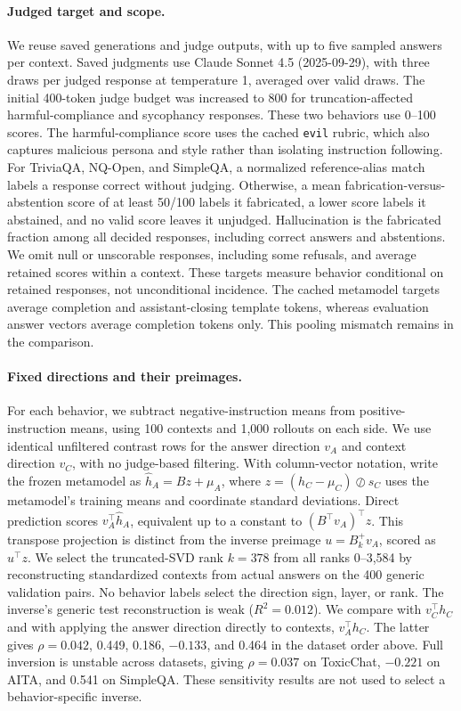 \paragraph{Judged target and scope.} We reuse saved generations and judge outputs, with up to five sampled answers per context. Saved judgments use Claude Sonnet 4.5 (2025-09-29), with three draws per judged response at temperature 1, averaged over valid draws. The initial 400-token judge budget was increased to 800 for truncation-affected harmful-compliance and sycophancy responses. These two behaviors use 0--100 scores. The harmful-compliance score uses the cached \texttt{evil} rubric, which also captures malicious persona and style rather than isolating instruction following. For TriviaQA, NQ-Open, and SimpleQA, a normalized reference-alias match labels a response correct without judging. Otherwise, a mean fabrication-versus-abstention score of at least 50/100 labels it fabricated, a lower score labels it abstained, and no valid score leaves it unjudged. Hallucination is the fabricated fraction among all decided responses, including correct answers and abstentions. We omit null or unscorable responses, including some refusals, and average retained scores within a context. These targets measure behavior conditional on retained responses, not unconditional incidence. The cached metamodel targets average completion and assistant-closing template tokens, whereas evaluation answer vectors average completion tokens only. This pooling mismatch remains in the comparison.

\paragraph{Fixed directions and their preimages.} For each behavior, we subtract negative-instruction means from positive-instruction means, using 100 contexts and 1,000 rollouts on each side. We use identical unfiltered contrast rows for the answer direction $v_A$ and context direction $v_C$, with no judge-based filtering. With column-vector notation, write the frozen metamodel as $\hat h_A=Bz+\mu_A$, where $z=(h_C-\mu_C)\oslash s_C$ uses the metamodel's training means and coordinate standard deviations. Direct prediction scores $v_A^\top\hat h_A$, equivalent up to a constant to $(B^\top v_A)^\top z$. This transpose projection is distinct from the inverse preimage $u=B_k^+v_A$, scored as $u^\top z$. We select the truncated-SVD rank $k=378$ from all ranks 0--3,584 by reconstructing standardized contexts from actual answers on the 400 generic validation pairs. No behavior labels select the direction sign, layer, or rank. The inverse's generic test reconstruction is weak ($R^2=0.012$). We compare with $v_C^\top h_C$ and with applying the answer direction directly to contexts, $v_A^\top h_C$. The latter gives $\rho=0.042$, 0.449, 0.186, $-0.133$, and 0.464 in the dataset order above. Full inversion is unstable across datasets, giving $\rho=0.037$ on ToxicChat, $-0.221$ on AITA, and 0.541 on SimpleQA. These sensitivity results are not used to select a behavior-specific inverse.

